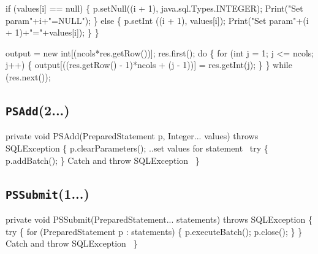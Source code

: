 \documentclass{article}
\def\nwendcode{\endtrivlist \endgroup}      %
\let\nwdocspar=\par
\theoremstyle{definition}                   %
\begin{document}
  if (values[i] == null) \{
    p.setNull((i + 1), java.sql.Types.INTEGER);
    Print("Set param"+i+"=NULL");
  \} else \{
    p.setInt ((i + 1), values[i]);
    Print("Set param"+(i + 1)+"="+values[i]);
  \}
\}
\nwendcode{}\nwdocspar
\nwenddocs{}\endmoddef{}
output = new int[(ncols*res.getRow())];
res.first();
do \{
  for (int j = 1; j <= ncols; j++) \{
    output[((res.getRow() - 1)*ncols + (j - 1))] = res.getInt(j);
  \}
\} while (res.next());
\nwendcode{}\nwdocspar

\subsection{{\tt{}\protect{}PSAdd}(2...)}
\nwenddocs{}\endmoddef{}
private void PSAdd(PreparedStatement p, Integer... values) throws SQLException \{
  p.clearParameters();
  \LA{}..set values for statement~{\nwtagstyle{}}\RA{}
  try \{
    p.addBatch();
  \}
  \LA{}Catch and throw \code{}SQLException\edoc{}~{\nwtagstyle{}}\RA{}
\}
\eatline
{}\nwendcode{}\nwdocspar
\subsection{{\tt{}\protect{}PSSubmit}(1...)}
\nwenddocs{}\endmoddef{}
private void PSSubmit(PreparedStatement... statements) throws SQLException \{
  try \{
    for (PreparedStatement p : statements) \{
      p.executeBatch();
      p.close();
    \}
  \}
  \LA{}Catch and throw \code{}SQLException\edoc{}~{\nwtagstyle{}}\RA{}
\}
\eatline
{}\nwendcode{}\nwdocspar
\end{document}

